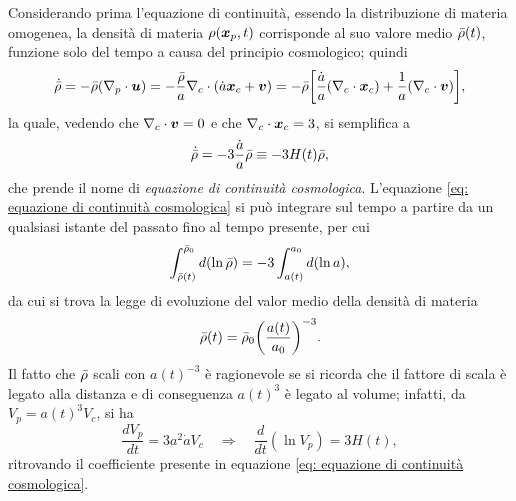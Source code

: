 Considerando prima l'equazione di continuità, essendo la distribuzione di materia omogenea, la densità di materia $\rho(\bm{x}_p,t)$ corrisponde al suo valore medio $\bar{\rho}(t)$, funzione solo del tempo a causa del principio cosmologico; quindi
\begin{equation}
    \dot{\bar{\rho}} = -\bar{\rho}(\nabla_p \cdot \bm{u}) = -\frac{\bar{\rho}}{a}\nabla_c \cdot (\dot{a}\bm{x}_c + \bm{v}) = -\bar{\rho}\bigg[\frac{\dot{a}}{a}(\nabla_c \cdot \bm{x}_c) + \frac{1}{a}(\nabla_c \cdot \bm{v})\bigg],
\end{equation}
la quale, vedendo che $\nabla_c \cdot \bm{v} = 0$ e che $\nabla_c \cdot \bm{x}_c = 3$, si semplifica a
\begin{equation}
\label{eq: equazione di continuità cosmologica}
    \dot{\bar{\rho}} = -3\frac{\dot{a}}{a}\bar{\rho} \equiv -3H(t)\bar{\rho},
\end{equation}
che prende il nome di \emph{equazione di continuità cosmologica}. L'equazione \eqref{eq: equazione di continuità cosmologica} si può integrare sul tempo a partire da un qualsiasi istante del passato fino al tempo presente, per cui
\begin{equation}
    \int_{\bar{\rho}(t)}^{\bar{\rho}_0} d(\ln{\bar{\rho}}) = -3\int_{a(t)}^{a_0} d(\ln{a}),
\end{equation}
da cui si trova la legge di evoluzione del valor medio della densità di materia
\begin{equation}
    \bar{\rho}(t) = \bar{\rho}_0\bigg(\frac{a(t)}{a_0}\bigg)^{-3}.
\end{equation}
Il fatto che $\bar{\rho}$ scali con $a(t)^{-3}$ è ragionevole se si ricorda che il fattore di scala è legato alla distanza e di conseguenza $a(t)^3$ è legato al volume; infatti, da $V_p = a(t)^3V_c$, si ha 
\begin{equation}
    \frac{dV_p}{dt} = 3a^2\dot{a}V_c\quad\Longrightarrow\quad \frac{d}{dt}(\ln{V_p}) = 3H(t),
\end{equation}
ritrovando il coefficiente presente in equazione \eqref{eq: equazione di continuità cosmologica}. 

